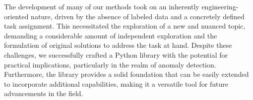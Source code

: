 \documentclass[12pt,a4paper]{article}
\begin{document}
The development of many of our methods took on an inherently engineering-oriented nature, driven by the absence of labeled data and a concretely defined task assignment. This necessitated the exploration of a new and nuanced topic, demanding a considerable amount of independent exploration and the formulation of original solutions to address the task at hand. Despite these challenges, we successfully crafted a Python library with the potential for practical implications, particularly in the realm of anomaly detection. Furthermore, the library provides a solid foundation that can be easily extended to incorporate additional capabilities, making it a versatile tool for future advancements in the field.




\clearpage


\end{document}
